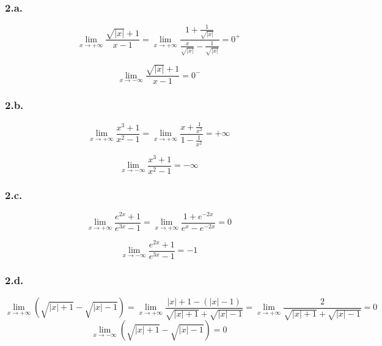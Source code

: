 \documentclass[a4paper,10pt]{report}
\begin{document}
\subsubsection*{2.a.}
\begin{displaymath}
	\lim_{x \rightarrow +\infty} \frac{\sqrt{|x|}+1}{x-1}
		= \lim_{x \rightarrow +\infty} \frac{1 + \frac{1}{\sqrt{|x|}}}{\frac{x}{\sqrt{|x|}}-\frac{1}{\sqrt{|x|}}}
		= 0^{+}
\end{displaymath}

\begin{displaymath}
	\lim_{x \rightarrow -\infty} \frac{\sqrt{|x|}+1}{x-1} = 0^{-}
\end{displaymath}

\subsubsection*{2.b.}
\begin{displaymath}
	\lim_{x \rightarrow +\infty} \frac{x^3+1}{x^2-1} = \lim_{x \rightarrow +\infty} \frac{ x+ \frac{1}{x^2} }{ 1- \frac{1}{x^2}} =+\infty
\end{displaymath}

\begin{displaymath}
	\lim_{x \rightarrow -\infty} \frac{x^3+1}{x^2-1} = -\infty
\end{displaymath}

\subsubsection*{2.c.}
\begin{displaymath}
	\lim_{x \rightarrow +\infty} \frac{e^{2x}+1}{e^{3x}-1} = \lim_{x \rightarrow +\infty} \frac{1+ e^{-2x}}{e^{x}-e^{-2x}} = 0
\end{displaymath}

\begin{displaymath}
	\lim_{x \rightarrow -\infty} \frac{e^{2x}+1}{e^{3x}-1} = -1
\end{displaymath}


\subsubsection*{2.d.}
\begin{displaymath}
	\lim_{x \rightarrow +\infty} \left( \sqrt{|x|+1} - \sqrt{|x|-1} \right)
		= \lim_{x \rightarrow +\infty} \frac{|x|+1-(|x|-1)}{\sqrt{|x|+1} + \sqrt{|x|-1}} = \lim_{x \rightarrow +\infty} \frac{2}{\sqrt{|x|+1} + \sqrt{|x|-1}} = 0
\end{displaymath}
\begin{displaymath}
	\lim_{x \rightarrow -\infty} \left( \sqrt{|x|+1} - \sqrt{|x|-1} \right) = 0
\end{displaymath}
\end{document}
